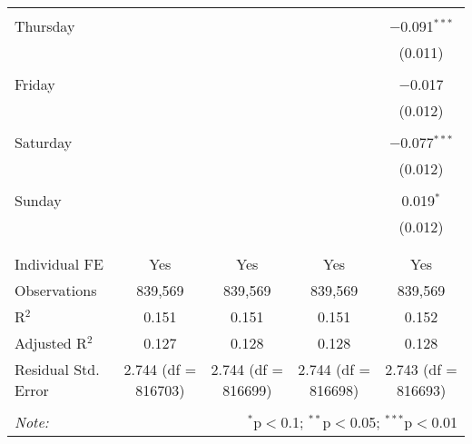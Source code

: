 \documentclass[
]{article}
\begin{document}
\begin{table}[!htbp]
{\begin{tabular}{@{\extracolsep{5pt}}lcccc}
  & & & & \\ 
 Thursday &  &  &  & $-$0.091$^{***}$ \\ 
  &  &  &  & (0.011) \\ 
  & & & & \\ 
 Friday &  &  &  & $-$0.017 \\ 
  &  &  &  & (0.012) \\ 
  & & & & \\ 
 Saturday &  &  &  & $-$0.077$^{***}$ \\ 
  &  &  &  & (0.012) \\ 
  & & & & \\ 
 Sunday &  &  &  & 0.019$^{*}$ \\ 
  &  &  &  & (0.012) \\ 
  & & & & \\ 
\hline \\[-1.8ex] 
Individual FE & Yes & Yes & Yes & Yes \\ 
Observations & 839,569 & 839,569 & 839,569 & 839,569 \\ 
R$^{2}$ & 0.151 & 0.151 & 0.151 & 0.152 \\ 
Adjusted R$^{2}$ & 0.127 & 0.128 & 0.128 & 0.128 \\ 
Residual Std. Error & 2.744 (df = 816703) & 2.744 (df = 816699) & 2.744 (df = 816698) & 2.743 (df = 816693) \\ 
\hline 
\hline \\[-1.8ex] 
\textit{Note:}  & \multicolumn{4}{r}{$^{*}$p$<$0.1; $^{**}$p$<$0.05; $^{***}$p$<$0.01} \\ 
\end{tabular}
} 
\end{table} 
\newpage
\end{document}
